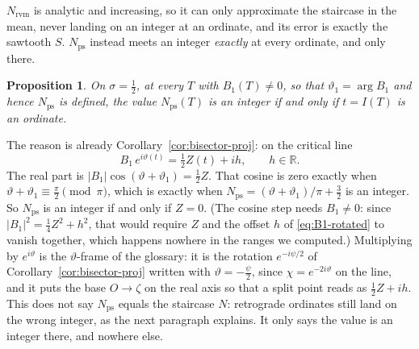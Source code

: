 \documentclass[11pt]{article}
\newtheorem{proposition}[theorem]{Proposition}
\theoremstyle{definition}
\begin{document}
$N_{\mathrm{rvm}}$ is analytic and increasing, so it can only approximate the
staircase in the mean, never landing on an integer at an ordinate, and its
error is exactly the sawtooth $S$.
$N_{\mathrm{ps}}$ instead meets an integer \emph{exactly} at every ordinate,
and only there.

\begin{proposition}\label{prop:N-ps-integer}
On $\sigma=\tfrac12$, at every $T$ with $B_1(T)\neq0$, so that
$\vartheta_1=\arg B_1$ and hence $N_{\mathrm{ps}}$ is defined, the value
$N_{\mathrm{ps}}(T)$ is an integer if and only if $t=I(T)$ is an ordinate.
\end{proposition}

The reason is already Corollary~\ref{cor:bisector-proj}: on the critical line
\begin{equation}\label{eq:B1-rotated}
B_1\,e^{i\vartheta(t)}=\tfrac12 Z(t)+ih,\qquad h\in\mathbb R.
\end{equation}
The real part is
$\lvert B_1\rvert\cos(\vartheta+\vartheta_1)=\tfrac12 Z$.
That cosine is zero exactly when
$\vartheta+\vartheta_1\equiv\tfrac\pi2\pmod\pi$, which is exactly when
$N_{\mathrm{ps}}=(\vartheta+\vartheta_1)/\pi+\tfrac32$ is an integer.
So $N_{\mathrm{ps}}$ is an integer if and only if $Z=0$. (The cosine step
needs $B_1\neq0$: since $|B_1|^{2}=\tfrac14Z^{2}+h^{2}$, that would require
$Z$ and the offset $h$ of \eqref{eq:B1-rotated} to vanish together, which
happens nowhere in the ranges we computed.)
Multiplying by $e^{i\vartheta}$ is the $\vartheta$-frame of the glossary:
it is the rotation $e^{-i\psi/2}$ of Corollary~\ref{cor:bisector-proj}
written with $\vartheta=-\tfrac{\psi}{2}$, since $\chi=e^{-2i\vartheta}$
on the line, and it puts the base $O\to\zeta$ on the real axis so that a
split point reads as $\tfrac12 Z+ih$.
This does not say $N_{\mathrm{ps}}$ equals the staircase $N$: retrograde
ordinates still land on the wrong integer, as the next paragraph
explains. It only says the value is an integer there, and nowhere else.
\end{document}
